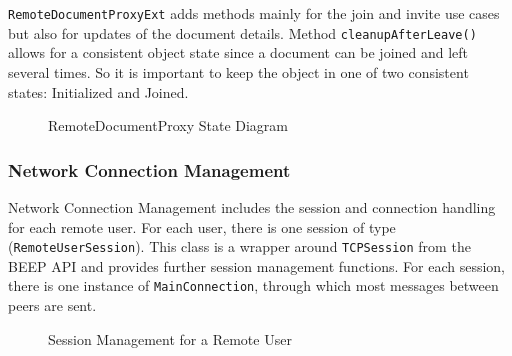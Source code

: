  \texttt{RemoteDocumentProxyExt} adds methods mainly for the join and invite use cases but also for updates of the document details. Method  \texttt{cleanupAfterLeave()} allows for a consistent object state since a document can be joined and left several times. So it is important to keep the object in one of two consistent states: Initialized and Joined.  

\begin{figure}[H]
 \centering
 \caption{RemoteDocumentProxy State Diagram}
 \label{fig:network.discovery.remotedocumentproxy.state}
\end{figure}

\subsubsection{Network Connection Management}
Network Connection Management includes the session and connection handling for each remote user. For each user, there is one session of type (\texttt{RemoteUserSession}). This class is a wrapper around \texttt{TCPSession} from the BEEP API and provides further session management functions. For each session, there is one instance of \texttt{MainConnection}, through which most messages between peers are sent.

\begin{figure}[H]
 \centering
 \caption{Session Management for a Remote User}
 \label{fig:network.discovery.sessionmanagement}
\end{figure}

